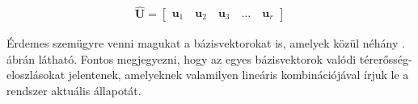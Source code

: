             \begin{equation}\label{equ:uhat}
                \begin{aligned}
                    \mathbf{\hat{U}} =
                    \begin{bmatrix}
                        \textbf{u}_1\quad\textbf{u}_2\quad\textbf{u}_3\quad\hdots\quad\textbf{u}_r
                    \end{bmatrix}
                \end{aligned}
            \end{equation}
            \par
            Érdemes szemügyre venni magukat a bázisvektorokat is, amelyek közül néhány . ábrán látható. Fontos megjegyezni, hogy az egyes bázisvektorok valódi térerősség-eloszlásokat jelentenek, amelyeknek valamilyen lineáris kombinációjával írjuk le a rendszer aktuális állapotát.
